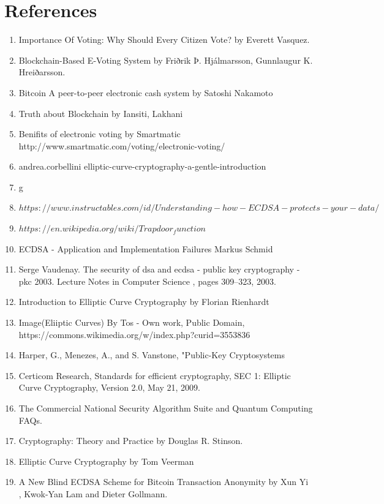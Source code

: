 \documentclass{article}
\begin{document}
\section{References}
\begin{enumerate}
    \item Importance Of Voting: Why Should Every Citizen Vote? by Everett Vasquez.
    \item Blockchain-Based E-Voting System by Friðrik Þ. Hjálmarsson, Gunnlaugur K. Hreiðarsson.
    \item  Bitcoin A peer-to-peer electronic cash system by Satoshi Nakamoto 
    \item Truth about Blockchain by Iansiti, Lakhani
    \item Benifits of electronic voting by Smartmatic     http://www.smartmatic.com/voting/electronic-voting/
    \item andrea.corbellini elliptic-curve-cryptography-a-gentle-introduction 
    \item g
    \item $https://www.instructables.com/id/Understanding-how-ECDSA-protects-your-data/$ 
    \item 	$https://en.wikipedia.org/wiki/Trapdoor_function$ 
    \item ECDSA - Application and Implementation Failures
Markus Schmid
    \item Serge Vaudenay. The security of dsa and ecdsa - public key
cryptography - pkc 2003. Lecture Notes in Computer Science
,
pages 309–323, 2003.
    \item Introduction to Elliptic Curve Cryptography
 by Florian Rienhardt
    \item Image(Eliiptic Curves) By Tos - Own work, Public Domain, https://commons.wikimedia.org/w/index.php?curid=3553836
    \item Harper, G., Menezes, A., and S. Vanstone, "Public-Key Cryptosystems
    \item Certicom Research, Standards for efficient cryptography, SEC 1: Elliptic Curve Cryptography, Version 2.0, May 21, 2009.
    \item The Commercial National Security Algorithm Suite and Quantum Computing FAQs.
    \item Cryptography: Theory and Practice by Douglas R. Stinson.
    \item Elliptic Curve Cryptography
 by Tom Veerman
     \item A New Blind ECDSA Scheme for Bitcoin Transaction Anonymity
 by Xun Yi , Kwok-Yan Lam and Dieter Gollmann.

\end{enumerate}
\end{document}
